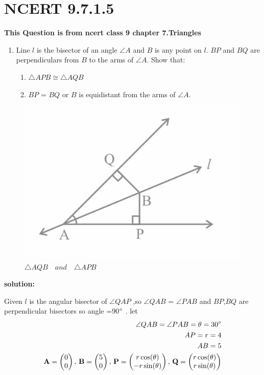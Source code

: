 \documentclass[11pt]{book}
\begin{document}
\section*{NCERT 9.7.1.5}
\textbf{This Question is from ncert class 9  chapter 7.Triangles }
\begin{enumerate}
    \item Line $l$ is the bisector of an angle $\angle A$ and $B$ is any point on $l$. $BP$ and $BQ$ are perpendiculars from $B$ to the arms of $\angle A$. Show that:
%
\begin{enumerate}
    \item $\triangle  APB \cong \triangle AQB$  
    \item $BP$ = $BQ$ or $B$ is equidistant from the arms of $\angle A$.
 
\end{enumerate}
\end{enumerate}

\begin{figure}[H]
    \centering
    \includegraphics[width=\columnwidth]{fig_mc.png}
    \caption{$\triangle AQB \hspace{12pt} and \hspace{12pt} \triangle APB$}
\end{figure}

\textbf{solution:}

Given $l$ is the angular bisector of $\angle QAP$ ,so $\angle QAB $ = $\angle PAB $ 
and $BP$,$BQ$ are perpendicular bisectors so angle =90$\degree$ .
%
let 
\begin{align}
	\angle QAB  = \angle PAB  =\theta = 30 \degree \\
	AP = r =4 \\
	AB = 5 \\
	\mathbf{A} = \begin{pmatrix}0 \\ 0\end{pmatrix} ,\,
	\mathbf{B} = \begin{pmatrix}5 \\ 0\end{pmatrix} ,\,
	\mathbf{P} = \begin{pmatrix}r\cos(\theta) \\ -r\sin(\theta)\end{pmatrix} ,\,
	\mathbf{Q} = \begin{pmatrix}r\cos(\theta) \\ r\sin(\theta)\end{pmatrix} \\
\end{align}
\end{document}
